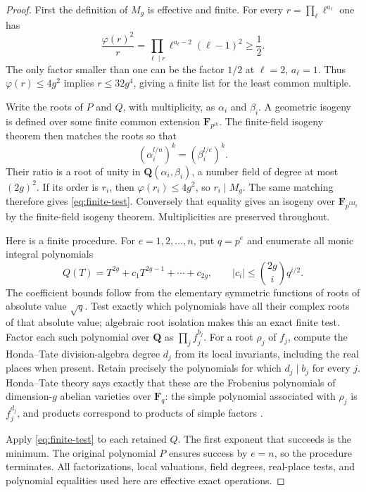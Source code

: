 \documentclass[11pt,a4paper]{article}
\newcommand{\Q}{\mathbf Q}
\newcommand{\F}{\mathbf F}
\theoremstyle{definition}
\theoremstyle{remark}
\begin{document}
\begin{proof}
First the definition of $M_g$ is effective and finite. For every
$r=\prod_\ell\ell^{a_\ell}$ one has
\[
 \frac{\varphi(r)^2}{r}
   =\prod_{\ell\mid r}\ell^{a_\ell-2}(\ell-1)^2
   \ge \frac12.
\]
The only factor smaller than one can be the factor $1/2$ at $\ell=2$,
$a_\ell=1$. Thus $\varphi(r)\le4g^2$ implies $r\le32g^4$,
giving a finite list for the least common multiple.

Write the roots of $P$ and $Q$, with multiplicity, as $\alpha_i$ and
$\beta_i$. A geometric isogeny is defined over some finite common
extension $\F_{p^{lk}}$. The finite-field isogeny theorem then
matches the roots so that
\[
       (\alpha_i^{l/n})^k=(\beta_i^{l/e})^k.
\]
Their ratio is a root of unity in $\Q(\alpha_i,\beta_i)$, a
number field of degree at most $(2g)^2$. If its order is $r_i$,
then $\varphi(r_i)\le4g^2$, so $r_i\mid M_g$. The same
matching therefore gives \eqref{eq:finite-test}. Conversely that
equality gives an isogeny over $\F_{p^{lM_g}}$ by the
finite-field isogeny theorem. Multiplicities are preserved throughout.

Here is a finite procedure. For $e=1,2,\ldots,n$, put $q=p^e$
and enumerate all monic integral polynomials
\[
 Q(T)=T^{2g}+c_1T^{2g-1}+\cdots+c_{2g},
 \qquad |c_i|\le {2g\choose i}q^{i/2}.
\]
The coefficient bounds follow from the elementary symmetric
functions of roots of absolute value $\sqrt q$. Test exactly which
polynomials have all their complex roots of that absolute value;
algebraic root isolation makes this an exact finite test. Factor each
such polynomial over $\Q$ as $\prod_j f_j^{b_j}$. For a root
$\rho_j$ of $f_j$, compute the Honda--Tate division-algebra degree
$d_j$ from its local invariants, including the real places when
present. Retain precisely the polynomials for which $d_j\mid b_j$
for every $j$. Honda--Tate theory says exactly that these are the
Frobenius polynomials of dimension-$g$ abelian varieties over
$\F_q$: the simple polynomial associated with $\rho_j$ is
$f_j^{d_j}$, and products correspond to products of simple factors
\citep[Theorem 1 and Remark 2, p.~96]{Tate1971}.

Apply \eqref{eq:finite-test} to each retained $Q$. The first
exponent that succeeds is the minimum. The original polynomial
$P$ ensures success by $e=n$, so the procedure terminates. All
factorizations, local valuations, field degrees, real-place tests,
and polynomial equalities used here are effective exact operations.
\end{proof}
\end{document}
